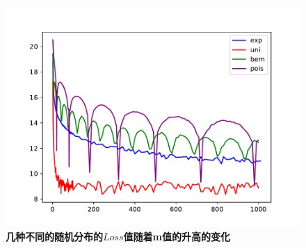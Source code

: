 \documentclass{article}
\begin{document}
\begin{figure}[h]
    \includegraphics[width=\textwidth]{../data/lossLines.pdf}
    \caption{\textbf{几种不同的随机分布的$Loss$值随着m值的升高的变化}}
    \label{res}
\end{figure}


\end{document}
